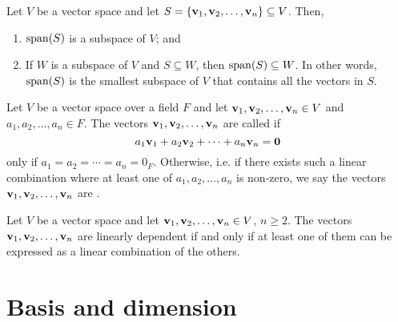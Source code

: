 \begin{thm}
Let $ V $ be a vector space and let $ S=\{\boldsymbol{\mathbf{v}}_1,\boldsymbol{\mathbf{v}}_2,\ldots,\boldsymbol{\mathbf{v}}_n\}\subseteq V $. Then,
\begin{enumerate}
    \item $ \operatorname{span}(S) $ is a subspace of $ V $; and
    \item If $ W $ is a subspace of $ V $ and $ S\subseteq W $, then $ \operatorname{span}(S)\subseteq W $. In other words, $ \operatorname{span}(S) $ is the smallest subspace of $ V $ that contains all the vectors in $ S $.
\end{enumerate}
\end{thm}

\begin{defn}
Let $ V $ be a vector space over a field $ F $ and let $ \boldsymbol{\mathbf{v}}_1,\boldsymbol{\mathbf{v}}_2,\ldots,\boldsymbol{\mathbf{v}}_n\in V $ and $ a_1,a_2,\ldots,a_n\in F $. The vectors $ \boldsymbol{\mathbf{v}}_1,\boldsymbol{\mathbf{v}}_2,\ldots,\boldsymbol{\mathbf{v}}_n $ are called  if
\begin{equation*}
    a_1\boldsymbol{\mathbf{v}}_1+a_2\boldsymbol{\mathbf{v}}_2+\cdots+a_n\boldsymbol{\mathbf{v}}_n=\boldsymbol{\mathbf{0}}
\end{equation*}
only if $ a_1=a_2=\cdots=a_n=0_F $. Otherwise, i.e. if there exists such a linear combination where at least one of $ a_1,a_2,\ldots,a_n $ is non-zero, we say the vectors $ \boldsymbol{\mathbf{v}}_1,\boldsymbol{\mathbf{v}}_2,\ldots,\boldsymbol{\mathbf{v}}_n $ are .
\end{defn}

\begin{thm}
Let $ V $ be a vector space and let $ \boldsymbol{\mathbf{v}}_1,\boldsymbol{\mathbf{v}}_2,\ldots,\boldsymbol{\mathbf{v}}_n\in V $, $ n\geq 2 $. The vectors $ \boldsymbol{\mathbf{v}}_1,\boldsymbol{\mathbf{v}}_2,\ldots,\boldsymbol{\mathbf{v}}_n $ are linearly dependent if and only if at least one of them can be expressed as a linear combination of the others.
\end{thm}

\section{Basis and dimension}